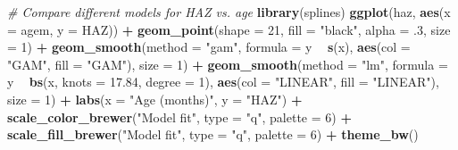 \documentclass[11pt,]{article}
\newenvironment{Shaded}{\begin{snugshade}}{\end{snugshade}}
\newcommand{\CommentTok}[1]{\textcolor[rgb]{0.56,0.35,0.01}{\textit{#1}}}
\newcommand{\DataTypeTok}[1]{\textcolor[rgb]{0.13,0.29,0.53}{#1}}
\newcommand{\DecValTok}[1]{\textcolor[rgb]{0.00,0.00,0.81}{#1}}
\newcommand{\FloatTok}[1]{\textcolor[rgb]{0.00,0.00,0.81}{#1}}
\newcommand{\KeywordTok}[1]{\textcolor[rgb]{0.13,0.29,0.53}{\textbf{#1}}}
\newcommand{\NormalTok}[1]{#1}
\newcommand{\OperatorTok}[1]{\textcolor[rgb]{0.81,0.36,0.00}{\textbf{#1}}}
\newcommand{\StringTok}[1]{\textcolor[rgb]{0.31,0.60,0.02}{#1}}
\begin{document}
\begin{Shaded}
\begin{Highlighting}[]
\CommentTok{# Compare different models for HAZ vs. age}
\KeywordTok{library}\NormalTok{(splines)}
\KeywordTok{ggplot}\NormalTok{(haz, }\KeywordTok{aes}\NormalTok{(}\DataTypeTok{x =}\NormalTok{ agem, }\DataTypeTok{y =}\NormalTok{ HAZ)) }\OperatorTok{+}
\StringTok{  }\KeywordTok{geom_point}\NormalTok{(}\DataTypeTok{shape =} \DecValTok{21}\NormalTok{, }\DataTypeTok{fill =} \StringTok{"black"}\NormalTok{, }\DataTypeTok{alpha =} \FloatTok{.3}\NormalTok{, }\DataTypeTok{size =} \DecValTok{1}\NormalTok{) }\OperatorTok{+}
\StringTok{  }\KeywordTok{geom_smooth}\NormalTok{(}\DataTypeTok{method =} \StringTok{"gam"}\NormalTok{, }\DataTypeTok{formula =}\NormalTok{ y }\OperatorTok{~}\StringTok{ }\KeywordTok{s}\NormalTok{(x), }\KeywordTok{aes}\NormalTok{(}\DataTypeTok{col =} \StringTok{"GAM"}\NormalTok{, }\DataTypeTok{fill =} \StringTok{"GAM"}\NormalTok{),}
              \DataTypeTok{size =} \DecValTok{1}\NormalTok{) }\OperatorTok{+}
\StringTok{  }\KeywordTok{geom_smooth}\NormalTok{(}\DataTypeTok{method =} \StringTok{"lm"}\NormalTok{, }\DataTypeTok{formula =}\NormalTok{ y }\OperatorTok{~}\StringTok{ }\KeywordTok{bs}\NormalTok{(x, }\DataTypeTok{knots =} \FloatTok{17.84}\NormalTok{, }\DataTypeTok{degree =} \DecValTok{1}\NormalTok{),}
              \KeywordTok{aes}\NormalTok{(}\DataTypeTok{col =} \StringTok{"LINEAR"}\NormalTok{, }\DataTypeTok{fill =} \StringTok{"LINEAR"}\NormalTok{), }\DataTypeTok{size =} \DecValTok{1}\NormalTok{) }\OperatorTok{+}
\StringTok{  }\KeywordTok{labs}\NormalTok{(}\DataTypeTok{x =} \StringTok{"Age (months)"}\NormalTok{, }\DataTypeTok{y =} \StringTok{"HAZ"}\NormalTok{) }\OperatorTok{+}
\StringTok{  }\KeywordTok{scale_color_brewer}\NormalTok{(}\StringTok{"Model fit"}\NormalTok{, }\DataTypeTok{type =} \StringTok{"q"}\NormalTok{, }\DataTypeTok{palette =} \DecValTok{6}\NormalTok{) }\OperatorTok{+}
\StringTok{  }\KeywordTok{scale_fill_brewer}\NormalTok{(}\StringTok{"Model fit"}\NormalTok{, }\DataTypeTok{type =} \StringTok{"q"}\NormalTok{, }\DataTypeTok{palette =} \DecValTok{6}\NormalTok{) }\OperatorTok{+}
\StringTok{  }\KeywordTok{theme_bw}\NormalTok{()}
\end{Highlighting}
\end{Shaded}
\end{document}
